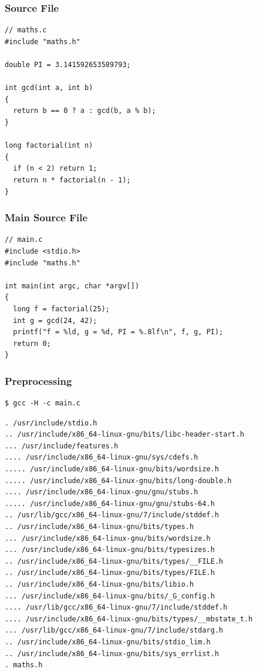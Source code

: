 \documentclass{beamer}
\begin{document}
\begin{frame}[fragile]
\frametitle{Source File}
\scriptsize
\begin{lstlisting}
// maths.c
#include "maths.h"

double PI = 3.141592653589793;

int gcd(int a, int b)
{
  return b == 0 ? a : gcd(b, a % b);
}

long factorial(int n)
{
  if (n < 2) return 1;
  return n * factorial(n - 1);
}

\end{lstlisting}

\end{frame}

\begin{frame}[fragile]
\frametitle{Main Source File}
\scriptsize
\begin{lstlisting}
// main.c
#include <stdio.h>
#include "maths.h"

int main(int argc, char *argv[])
{
  long f = factorial(25);
  int g = gcd(24, 42);
  printf("f = %ld, g = %d, PI = %.8lf\n", f, g, PI);
  return 0;
}
\end{lstlisting}

\end{frame}

\begin{frame}[fragile]
\frametitle{Preprocessing}
\scriptsize
\begin{verbatim}
$ gcc -H -c main.c
\end{verbatim}
\tiny
\begin{verbatim}
. /usr/include/stdio.h
.. /usr/include/x86_64-linux-gnu/bits/libc-header-start.h
... /usr/include/features.h
.... /usr/include/x86_64-linux-gnu/sys/cdefs.h
..... /usr/include/x86_64-linux-gnu/bits/wordsize.h
..... /usr/include/x86_64-linux-gnu/bits/long-double.h
.... /usr/include/x86_64-linux-gnu/gnu/stubs.h
..... /usr/include/x86_64-linux-gnu/gnu/stubs-64.h
.. /usr/lib/gcc/x86_64-linux-gnu/7/include/stddef.h
.. /usr/include/x86_64-linux-gnu/bits/types.h
... /usr/include/x86_64-linux-gnu/bits/wordsize.h
... /usr/include/x86_64-linux-gnu/bits/typesizes.h
.. /usr/include/x86_64-linux-gnu/bits/types/__FILE.h
.. /usr/include/x86_64-linux-gnu/bits/types/FILE.h
.. /usr/include/x86_64-linux-gnu/bits/libio.h
... /usr/include/x86_64-linux-gnu/bits/_G_config.h
.... /usr/lib/gcc/x86_64-linux-gnu/7/include/stddef.h
.... /usr/include/x86_64-linux-gnu/bits/types/__mbstate_t.h
... /usr/lib/gcc/x86_64-linux-gnu/7/include/stdarg.h
.. /usr/include/x86_64-linux-gnu/bits/stdio_lim.h
.. /usr/include/x86_64-linux-gnu/bits/sys_errlist.h
. maths.h
\end{verbatim}

\end{frame}
\end{document}
